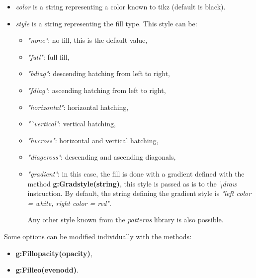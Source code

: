 \begin{itemize}
    \item \emph{color} is a string representing a color known to tikz (default is black).     \item \emph{style} is a string representing the fill type. This style can be:
\begin{itemize}
    \item \emph{"none"}: no fill, this is the default value,
    \item \emph{"full"}: full fill,
    \item \emph{"bdiag"}: descending hatching from left to right,
    \item \emph{"fdiag"}: ascending hatching from left to right,
    \item \emph{"horizontal"}: horizontal hatching,
    \item \emph{"`vertical"}: vertical hatching,
    \item \emph{"hvcross"}: horizontal and vertical hatching,
    \item \emph{"diagcross"}: descending and ascending diagonals,
    \item \emph{"gradient"}: in this case, the fill is done with a gradient defined with the method \textbf{g:Gradstyle(string)}, this style is passed as is to the \emph{\textbackslash draw} instruction. By default, the string defining the gradient style is \emph{"left color = white, right color = red"}.

Any other style known from the \emph{patterns} library is also possible.

\end{itemize}
\end{itemize}

Some options can be modified individually with the methods:
\begin{itemize}

    \item \textbf{g:Fillopacity(opacity)},

    \item \textbf{g:Filleo(evenodd)}.

\end{itemize}

